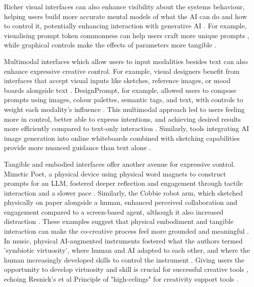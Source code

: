 Richer visual interfaces can also enhance visibility about the systems behaviour, helping users build more accurate mental models of what the AI can do and how to control it, potentially enhancing interaction with generative AI \cite{Weisz2024-io, Amershi2019-vy}. For example, visualising prompt token commonness can help users craft more unique prompts \cite{Chang2023-tv}, while graphical controls make the effects of parameters more tangible \cite{Davis2024-ml}. 

Multimodal interfaces which allow users to input modalities besides text can also enhance expressive creative control. For example, visual designers benefit from interfaces that accept visual inputs like sketches, reference images, or mood boards alongside text \cite{Park2024-gw, Peng2024-tr}. DesignPrompt, for example, allowed users to compose prompts using images, colour palettes, semantic tags, and text, with controls to weight each modality's influence \cite{Peng2024-tr}. This multimodal approach led to users feeling more in control, better able to express intentions, and achieving desired results more efficiently compared to text-only interaction \cite{Peng2024-tr}. Similarly, tools integrating AI image generation into online whiteboards combined with sketching capabilities provide more nuanced guidance than text alone \cite{Verheijden2023-gn}.

Tangible and embodied interfaces offer another avenue for expressive control. Mimetic Poet, a physical device using physical word magnets to construct prompts for an LLM, fostered deeper reflection and engagement through tactile interaction and a slower pace \cite{McCormack2024-gv}. Similarly, the Cobbie robot arm, which sketched physically on paper alongside a human, enhanced perceived collaboration and engagement compared to a screen-based agent, although it also increased distraction \cite{Lin2020-ji}. These examples suggest that physical embodiment and tangible interaction can make the co-creative process feel more grounded and meaningful \cite{McCormack2024-gv, Lin2020-ji}. In music, physical AI-augmented instruments fostered what the authors termed 'symbiotic virtuosity', where human and AI adapted to each other, and where the human increasingly developed skills to control the instrument \cite{Blanchard2024-jz}. Giving users the opportunity to develop virtuosity and skill is crucial for successful creative tools \cite{Lee2024-tu}, echoing Resnick's et al Principle of "high-celings" for creativity support tools \cite{Resnick2005-fs}. 

